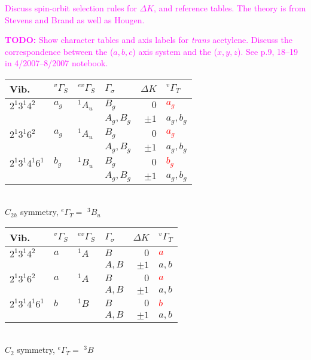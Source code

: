 \documentclass[12pt]{mitthesis}
\newcommand{\TODO} [1]{\textcolor{magenta}{\textbf{TODO:} #1}}
\newcommand{\POINT}[1]{\textcolor{magenta}{#1}}
\begin{document}
\POINT{Discuss spin-orbit selection rules for $\Delta K$, and
  reference tables.  The theory is from Stevens and Brand as well as
  Hougen.}

\TODO{Show character tables and axis labels for \emph{trans}
  acetylene.  Discuss the correspondence between the ($a,b,c$) axis
  system and the ($x,y,z$).  See p.9, 18--19 in 4/2007--8/2007 notebook.}

\begin{table}
  \centering
  \begin{tabular}{llllrl}
    Vib.
    & $^{v}\Gamma_S$ & $^{ev}\Gamma_S$ & $\Gamma_\sigma$ 
    & $\Delta K$ & $^{v}\Gamma_T$ \\
    \toprule

    $2^1 3^1 4^2$ 
    & $a_g$ & $^{1}A_u$ & $B_g$ & $0$ & \textcolor{red}{$a_g$} \\
    & & & $A_g, B_g$ & $\pm 1$ & $a_g, b_g$ \\

    $2^1 3^1 6^2$
    & $a_g$ & $^{1}A_u$ & $B_g$ & $0$ & \textcolor{red}{$a_g$} \\
    & & & $A_g, B_g$ & $\pm 1$ & $a_g, b_g$ \\

    $2^1 3^1 4^1 6^1$ 
    & $b_g$ & $^{1}B_u$ & $B_g$ & $0$ & \textcolor{red}{$b_g$} \\
    &      &                 & $A_g, B_g$ & $\pm1$     & $a_g, b_g$ \\
  \end{tabular}\\[5mm]
  
  $C_{2h}$ symmetry, $^{e}\Gamma_T =$ $^{3}B_u$\\[1cm]

  \begin{tabular}{llllrl}
    Vib.
    & $^{v}\Gamma_S$ & $^{ev}\Gamma_S$ & $\Gamma_\sigma$ & $\Delta K$ & $^{v}\Gamma_T$ \\
    \toprule
    $2^1 3^1 4^2$
    & $a$ & $^{1}A$ & $B$ & $0$ & \textcolor{red}{$a$} \\
    & & & $A, B$ & $\pm 1$ & $a, b$ \\

    $2^1 3^1 6^2$
    & $a$ & $^{1}A$ & $B$ & $0$ & \textcolor{red}{$a$} \\
    & & & $A, B$ & $\pm 1$ & $a, b$ \\
    
    $2^1 3^1 4^1 6^1$
    & $b$ & $^{1}B$ & $B$ & $0$ &\textcolor{red}{$b$} \\
    & & & $A, B$ & $\pm1$ & $a, b$ \\
  \end{tabular}\\[5mm]

  $C_{2}$ symmetry, $^{e}\Gamma_T =$ $^{3}B$
\end{table}
\end{document}
